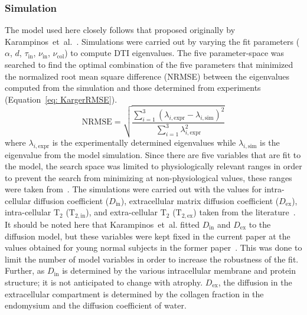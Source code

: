 \subsubsection{Simulation}
The model used here closely follows that proposed originally by Karampinos~et~al.~\cite{RND12}. 
Simulations were carried out by varying the fit parameters ($\alpha$, $d$, $\tau_{\mathrm{in}}$, $\nu_{\mathrm{in}}$, $\nu_{\mathrm{col}}$) to compute DTI eigenvalues. 
The five parameter-space was searched to find the optimal combination of the five parameters that minimized the normalized root mean square difference (NRMSE) between the eigenvalues computed from the simulation and those determined from experiments (Equation~\ref{eq: KargerRMSE}).
\begin{equation}\label{eq: KargerRMSE}
\mathrm{NRMSE} = \sqrt{\dfrac{\sum\limits_{i=1}^3 \left( \lambda_{i,\mathrm{expr}}-\lambda_{i, \mathrm{sim}} \right)^2}{\sum\limits_{i=1}^3 \lambda_{i,\mathrm{expr}}^2}}
\end{equation}
where $\lambda_{i,\mathrm{expr}}$ is the experimentally determined eigenvalues while $\lambda_{i,\mathrm{sim}}$ is the eigenvalue from the model simulation. 
Since there are five variables that are fit to the model, the search space was limited to physiologically relevant ranges in order to prevent the search from minimizing at non-physiological values, these ranges were taken from~\cite{RND12}. 
The simulations were carried out with the values for intra-cellular diffusion coefficient ($D_{\mathrm{in}}$), extracellular matrix diffusion coefficient ($D_{\mathrm{ex}}$), intra-cellular $\mathrm{T_2}$ ($\mathrm{T}_{\mathrm{2,in}}$), and extra-cellular $\mathrm{T_2}$ ($\mathrm{T}_{\mathrm{2,ex}}$) taken from the literature~\cite{RND12, RND26}.
It should be noted here that Karampinos~et~al. fitted $D_{\mathrm{in}}$ and $D_{\mathrm{ex}}$ to the diffusion model, but these variables were kept fixed in the current paper at the values obtained for young normal subjects in the former paper~\cite{RND12}. 
This was done to limit the number of model variables in order to increase the robustness of the fit.
Further, as $D_{\mathrm{in}}$ is determined by the various intracellular membrane and protein structure; it is not anticipated to change with atrophy. 
$D_{\mathrm{ex}}$, the diffusion in the extracellular compartment is determined by the collagen fraction in the endomysium and the diffusion coefficient of water.
